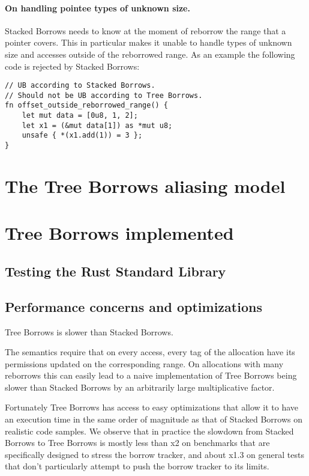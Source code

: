 \documentclass[a4paper,11pt]{article}
\theoremstyle{plain}
\theoremstyle{definition}
\theoremstyle{remark}
\begin{document}
\paragraph*{On handling pointee types of unknown size.}
Stacked Borrows needs to know at the moment of reborrow the range that a pointer
covers. This in particular makes it unable to handle types of unknown size and
accesses outside of the reborrowed range.
As an example the following code is rejected by Stacked Borrows:
\begin{lstlisting}
// UB according to Stacked Borrows.
// Should not be UB according to Tree Borrows.
fn offset_outside_reborrowed_range() {
    let mut data = [0u8, 1, 2];
    let x1 = (&mut data[1]) as *mut u8;
    unsafe { *(x1.add(1)) = 3 };
}
\end{lstlisting}

\section{The Tree Borrows aliasing model}


\section{Tree Borrows implemented}

\subsection{Testing the Rust Standard Library}

\subsection{Performance concerns and optimizations}

Tree Borrows is slower than Stacked Borrows.

The semantics require that on every access, every tag of the allocation have its
permissions updated on the corresponding range. On allocations with many reborrows
this can easily lead to a naive implementation of Tree Borrows being slower than
Stacked Borrows by an arbitrarily large multiplicative factor.

Fortunately Tree Borrows has access to easy optimizations that allow it to have
an execution time in the same order of magnitude as that of Stacked Borrows on
realistic code samples. We observe that in practice the slowdown from Stacked Borrows
to Tree Borrows is mostly less than x2 on benchmarks that are specifically designed
to stress the borrow tracker, and about x1.3 on general tests that don't particularly attempt to
push the borrow tracker to its limits.
\end{document}
